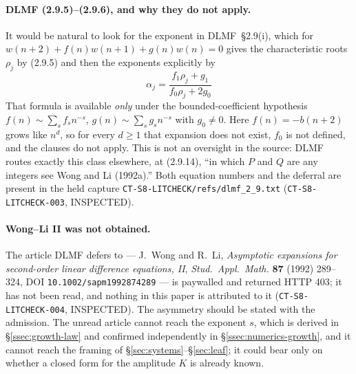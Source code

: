 \paragraph{DLMF (2.9.5)--(2.9.6), and why they do not apply.} It would be
natural to look for the exponent in DLMF~\S2.9(i), which for
$w(n+2)+f(n)w(n+1)+g(n)w(n)=0$ gives the characteristic roots $\rho_j$ by
(2.9.5) and then the exponents explicitly by
\[
  \alpha_j=\frac{f_1\rho_j+g_1}{f_0\rho_j+2g_0}
  \tag{DLMF 2.9.6}
\]
That formula is available \emph{only} under the bounded-coefficient hypothesis
$f(n)\sim\sum_s f_s n^{-s}$, $g(n)\sim\sum_s g_s n^{-s}$ with $g_0\neq0$. Here
$f(n)=-b(n+2)$ grows like $n^{d}$, so for every $d\ge1$ that expansion does not
exist, $f_0$ is not defined, and the clauses do not apply. This is not an
oversight in the source: DLMF routes exactly this class elsewhere, at (2.9.14),
``in which $P$ and $Q$ are any integers see Wong and Li (1992a).'' Both equation
numbers and the deferral are present in the held capture
\texttt{CT-S8-LITCHECK/refs/dlmf\_2\_9.txt}
(\texttt{CT-S8-LITCHECK-003}, INSPECTED).

\paragraph{Wong--Li II was not obtained.} The article DLMF defers to ---
J.~Wong and R.~Li, \emph{Asymptotic expansions for second-order linear
difference equations, II}, \emph{Stud.\ Appl.\ Math.} \textbf{87} (1992)
289--324, DOI \texttt{10.1002/sapm1992874289} --- is paywalled and returned HTTP
403; it has not been read, and nothing in this paper is attributed to it
(\texttt{CT-S8-LITCHECK-004}, INSPECTED). The asymmetry should be stated with
the admission. The unread article cannot reach the exponent $s$, which is
derived in \S\ref{ssec:growth-law} and confirmed independently in
\S\ref{ssec:numerics-growth}, and it cannot reach the framing of
\S\ref{sec:systems}--\S\ref{sec:leaf}; it could bear only on whether a closed form
for the amplitude $K$ is already known.

